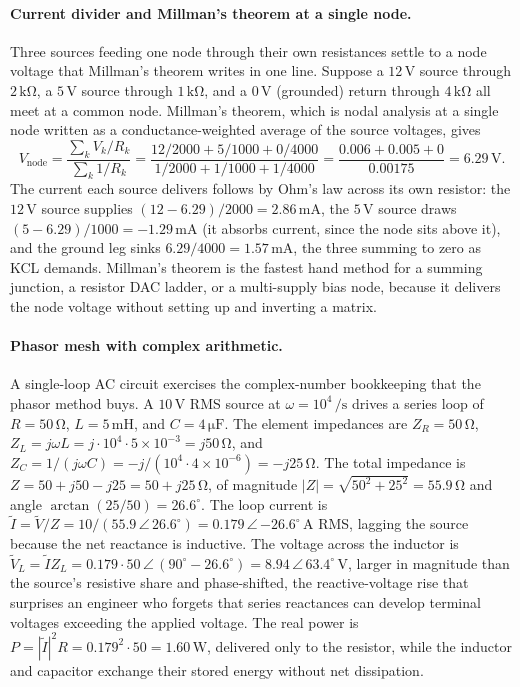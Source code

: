 \paragraph{Current divider and Millman's theorem at a single node.}
Three sources feeding one node through their own resistances settle to a node
voltage that Millman's theorem writes in one line. Suppose a $12\,\si{\volt}$
source through $2\,\si{\kilo\ohm}$, a $5\,\si{\volt}$ source through
$1\,\si{\kilo\ohm}$, and a $0\,\si{\volt}$ (grounded) return through
$4\,\si{\kilo\ohm}$ all meet at a common node. Millman's theorem, which is
nodal analysis at a single node written as a conductance-weighted average of
the source voltages, gives
\[
V_{\text{node}} = \frac{\sum_k V_k/R_k}{\sum_k 1/R_k}
= \frac{12/2000 + 5/1000 + 0/4000}{1/2000 + 1/1000 + 1/4000}
= \frac{0.006 + 0.005 + 0}{0.00175}
= 6.29\,\si{\volt}.
\]
The current each source delivers follows by Ohm's law across its own
resistor: the $12\,\si{\volt}$ source supplies $(12 - 6.29)/2000 =
2.86\,\si{\milli\ampere}$, the $5\,\si{\volt}$ source draws
$(5 - 6.29)/1000 = -1.29\,\si{\milli\ampere}$ (it absorbs current, since the
node sits above it), and the ground leg sinks $6.29/4000 = 1.57\,\si{\milli
\ampere}$, the three summing to zero as KCL demands. Millman's theorem is the
fastest hand method for a summing junction, a resistor DAC ladder, or a
multi-supply bias node, because it delivers the node voltage without setting
up and inverting a matrix.

\paragraph{Phasor mesh with complex arithmetic.}
A single-loop AC circuit exercises the complex-number bookkeeping that the
phasor method buys. A $10\,\si{\volt}$ RMS source at $\omega = 10^{4}\,\si{
\per\second}$ drives a series loop of $R = 50\,\si{\ohm}$, $L = 5\,\si{\milli
\henry}$, and $C = 4\,\si{\micro\farad}$. The element impedances are $Z_R =
50\,\si{\ohm}$, $Z_L = j\omega L = j\cdot 10^{4}\cdot 5\times 10^{-3} =
j50\,\si{\ohm}$, and $Z_C = 1/(j\omega C) = -j/(10^{4}\cdot 4\times 10^{-6})
= -j25\,\si{\ohm}$. The total impedance is $Z = 50 + j50 - j25 = 50 +
j25\,\si{\ohm}$, of magnitude $|Z| = \sqrt{50^2 + 25^2} = 55.9\,\si{\ohm}$
and angle $\arctan(25/50) = 26.6^\circ$. The loop current is $\tilde I =
\tilde V/Z = 10/(55.9\,\angle\,26.6^\circ) = 0.179\,\angle\,{-26.6^\circ}\,
\si{\ampere}$ RMS, lagging the source because the net reactance is inductive.
The voltage across the inductor is $\tilde V_L = \tilde I Z_L = 0.179\cdot
50\,\angle\,(90^\circ - 26.6^\circ) = 8.94\,\angle\,63.4^\circ\,\si{\volt}$,
larger in magnitude than the source's resistive share and phase-shifted, the
reactive-voltage rise that surprises an engineer who forgets that series
reactances can develop terminal voltages exceeding the applied voltage. The
real power is $P = |\tilde I|^2 R = 0.179^2\cdot 50 = 1.60\,\si{\watt}$,
delivered only to the resistor, while the inductor and capacitor exchange
their stored energy without net dissipation.

